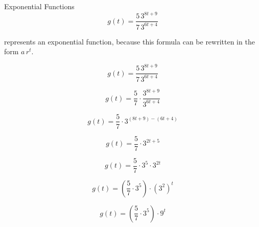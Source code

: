 \documentclass{ximera}
\begin{document}
\begin{example}  Exponential Functions \\



\[ g(t) = \frac{5 \, 3^{8 t + 9}}{7 \, 3^{6 t + 4}} \]

represents an exponential function, because this formula can be rewritten in the form $a \, r^t$.   \\


\begin{explanation}


\[ g(t) = \frac{5 \, 3^{8 t + 9}}{7 \, 3^{6 t + 4}} \]



\[ 
g(t) = \frac{5}{7} \cdot \frac{3^{8 t + 9}}{3^{6 t + 4}} 
\]



\[ 
g(t) = \frac{5}{7} \cdot 3^{(8 t + 9)-(6 t + 4)}
\]




\[ 
g(t) = \frac{5}{7} \cdot 3^{2 t + 5}
\]


\[ 
g(t) = \frac{5}{7} \cdot 3^5 \cdot 3^{2 t}
\]



\[ 
g(t) = \left( \frac{5}{7} \cdot 3^5 \right) \cdot (3^2)^t
\]




\[ 
g(t) = \left( \frac{5}{7} \cdot 3^5 \right) \cdot 9^t
\]








\end{explanation}

\end{example}
\end{document}

